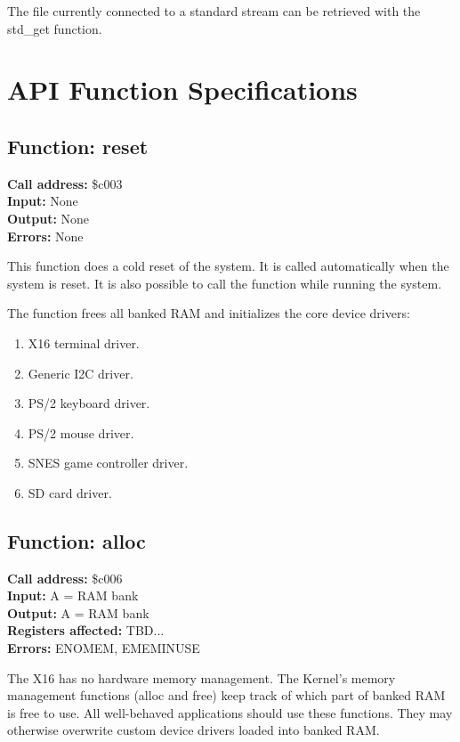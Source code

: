 The file currently connected to a standard stream can be retrieved with the std\_get function.


\section{API Function Specifications}

\subsection{Function: reset}

\textbf{Call address:} \$c003 \\
\textbf{Input:} None \\
\textbf{Output:} None \\
\textbf{Errors:} None

This function does a cold reset of the system. It is called automatically when
the system is reset. It is also possible to call the function while
running the system.

The function frees all banked RAM and initializes the core device drivers:

\begin{enumerate}\addtocounter{enumi}{-1}
    \item X16 terminal driver.
    \item Generic I2C driver.
    \item PS/2 keyboard driver.
    \item PS/2 mouse driver.
    \item SNES game controller driver.
    \item SD card driver.
\end{enumerate}


\subsection{Function: alloc}

\textbf{Call address:} \$c006 \\
\textbf{Input:} A = RAM bank \\
\textbf{Output:} A = RAM bank \\
\textbf{Registers affected:} TBD... \\
\textbf{Errors:} ENOMEM, EMEMINUSE

The X16 has no hardware memory management. The Kernel's memory management functions 
(alloc and free) keep track of which part of banked RAM is free to use. All well-behaved
applications should use these functions. They may otherwise overwrite custom
device drivers loaded into banked RAM.

